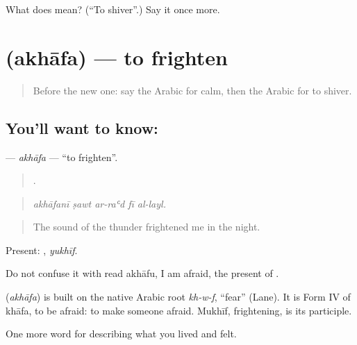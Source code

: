 \begin{tcolorbox}[breakable,colback=teal!4,colframe=teal!35!black,title={Before you move on}]
What does  mean? (\textquotedblleft{}To shiver\textquotedblright{}.) Say it once more.
\end{tcolorbox}
\section[\texorpdfstring{\ar{أخاف} (akhāfa)}{أخاف (akhāfa)}]{ (akhāfa) — to frighten}

\label{lesson:AR-C489-akhafa}



\begin{quote}
Before the new one: say the Arabic for calm, then the Arabic for to shiver.
\end{quote}

\subsection*{You'll want to know: }
\textbf{} — \emph{akhāfa} — \textquotedblleft{}to frighten\textquotedblright{}.

\begin{quote}
    .
\end{quote}

\begin{quote}
\emph{akhāfanī ṣawt ar-raʿd fī al-layl.}
\end{quote}

\begin{quote}
The sound of the thunder frightened me in the night.
\end{quote}

Present: , \emph{yukhīf}.

Do not confuse it with  read akhāfu, I am afraid, the present of .

\begin{cousinweb}
\textbf{} (\emph{akhāfa}) is built on the native Arabic root \emph{kh-w-f}, \textquotedblleft{}fear\textquotedblright{} (Lane). It is Form IV of khāfa, to be afraid: to make someone afraid. Mukhīf, frightening, is its participle.
\end{cousinweb}

\begin{grammarlens}[title={What you've built}]
One more word for describing what you lived and felt.
\end{grammarlens}

